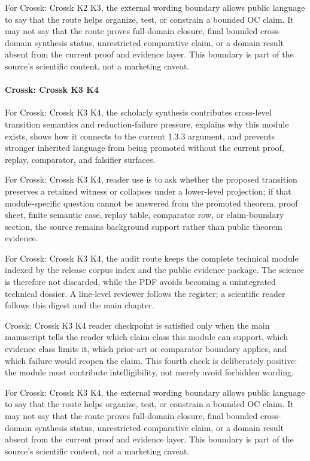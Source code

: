For Crossk: Crossk K2 K3, the external wording boundary allows public language to say that the route helps organize, test, or constrain a bounded OC claim. It may not say that the route proves full-domain closure, final bounded cross-domain synthesis status, unrestricted comparative claim, or a domain result absent from the current proof and evidence layer. This boundary is part of the source's scientific content, not a marketing caveat.


\paragraph{Crossk: Crossk K3 K4}

For Crossk: Crossk K3 K4, the scholarly synthesis contributes cross-level transition semantics and reduction-failure pressure, explains why this module exists, shows how it connects to the current 1.3.3 argument, and prevents stronger inherited language from being promoted without the current proof, replay, comparator, and falsifier surfaces.


For Crossk: Crossk K3 K4, reader use is to ask whether the proposed transition preserves a retained witness or collapses under a lower-level projection; if that module-specific question cannot be answered from the promoted theorem, proof sheet, finite semantic case, replay table, comparator row, or claim-boundary section, the source remains background support rather than public theorem evidence.


For Crossk: Crossk K3 K4, the audit route keeps the complete technical module indexed by the release corpus index and the public evidence package. The science is therefore not discarded, while the PDF avoids becoming a unintegrated technical dossier. A line-level reviewer follows the register; a scientific reader follows this digest and the main chapter.


Crossk: Crossk K3 K4 reader checkpoint is satisfied only when the main manuscript tells the reader which claim class this module can support, which evidence class limits it, which prior-art or comparator boundary applies, and which failure would reopen the claim. This fourth check is deliberately positive: the module must contribute intelligibility, not merely avoid forbidden wording.


For Crossk: Crossk K3 K4, the external wording boundary allows public language to say that the route helps organize, test, or constrain a bounded OC claim. It may not say that the route proves full-domain closure, final bounded cross-domain synthesis status, unrestricted comparative claim, or a domain result absent from the current proof and evidence layer. This boundary is part of the source's scientific content, not a marketing caveat.


